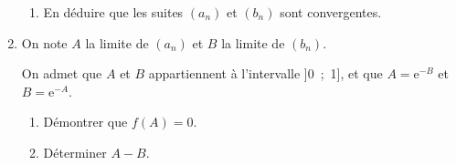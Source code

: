 \documentclass[11pt,a4paper,french]{article}
\begin{document}
\begin{enumerate}
\begin{enumerate}
		\item En déduire que les suites $\left(a_n\right)$ et $\left(b_n\right)$ sont convergentes.
	\end{enumerate}	
\item On note $A$ la limite de $\left(a_n\right)$ et $B$ la limite de $\left(b_n\right)$.

On admet que $A$ et $B$ appartiennent à l'intervalle ]0~;~1], et que $A = \text{e}^{-B}$ et $B = \text{e}^{-A}$.
	\begin{enumerate}
		\item Démontrer que $f(A) = 0$.
		\item Déterminer $A - B$.
	\end{enumerate}
\end{enumerate}
\end{document}
